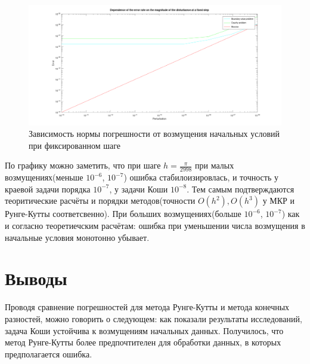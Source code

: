 \documentclass{article}
\begin{document}
	\begin{figure}[h]
		\centering
			\includegraphics[width=\textwidth]{graphic2.png}
			\caption{Зависимость нормы погрешности от возмущения начальных условий при
				фиксированном шаге}
	\end{figure}
	По графику можно заметить, что при шаге $h = \frac{\pi}{2998}$ при малых возмущениях(меньше $10^{-6}$, $10^{-7}$) ошибка стабилоизировлась, и точность у краевой задачи порядка $10^{-7}$, у задачи Коши $10^{-8}$. Тем самым подтверждаются теоритические расчёты и порядки методов(точности $O(h^2), O(h^3)$ у МКР и Рунге-Кутты соответсвенно).   При больших возмущениях(больше $10^{-6}$, $10^{-7}$) как и согласно теоретиечским расчётам: ошибка при уменьшении числа возмущения в начальные условия монотонно убывает.
	\section{Выводы}

	
	Проводя сравнение погрешностей для метода Рунге-Кутты и метода конечных разностей, можно говорить о следующем: как показали результаты исследований, задача Коши устойчива к возмущениям начальных данных. Получилось, что метод Рунге-Кутты более предпочтителен для обработки данных, в которых предполагается ошибка.
\end{document}

